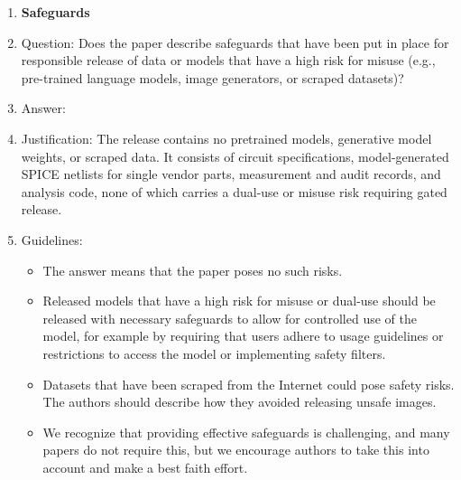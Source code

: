 \begin{enumerate}
\begin{itemize}
        \item If there are negative societal impacts, the authors could also discuss possible mitigation strategies (e.g., gated release of models, providing defenses in addition to attacks, mechanisms for monitoring misuse, mechanisms to monitor how a system learns from feedback over time, improving the efficiency and accessibility of ML).
    \end{itemize}
    
\item {\bf Safeguards}
    \item[] Question: Does the paper describe safeguards that have been put in place for responsible release of data or models that have a high risk for misuse (e.g., pre-trained language models, image generators, or scraped datasets)?
    \item[] Answer: \answerNA{}
    \item[] Justification: The release contains no pretrained models, generative model weights, or scraped data. It consists of circuit specifications, model-generated SPICE netlists for single vendor parts, measurement and audit records, and analysis code, none of which carries a dual-use or misuse risk requiring gated release.
    \item[] Guidelines:
    \begin{itemize}
        \item The answer \answerNA{} means that the paper poses no such risks.
        \item Released models that have a high risk for misuse or dual-use should be released with necessary safeguards to allow for controlled use of the model, for example by requiring that users adhere to usage guidelines or restrictions to access the model or implementing safety filters. 
        \item Datasets that have been scraped from the Internet could pose safety risks. The authors should describe how they avoided releasing unsafe images.
        \item We recognize that providing effective safeguards is challenging, and many papers do not require this, but we encourage authors to take this into account and make a best faith effort.
    \end{itemize}


\end{enumerate}
